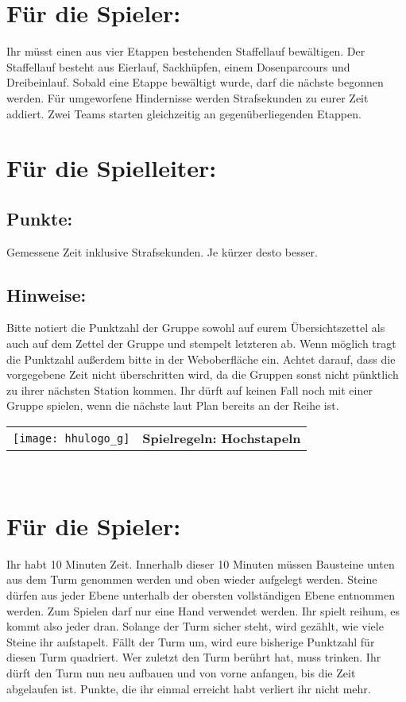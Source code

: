 \documentclass[a4paper,10pt]{article}
\def\spielc{Hochstapeln}
\newcommand{\unten}{
 Bitte notiert die Punktzahl der Gruppe sowohl auf eurem Übersichtszettel als auch auf dem Zettel der Gruppe und stempelt letzteren ab. Wenn möglich tragt die Punktzahl außerdem bitte in der Weboberfläche ein.
 Achtet darauf, dass die vorgegebene Zeit nicht überschritten wird, da die Gruppen sonst nicht pünktlich zu ihrer nächsten Station kommen. Ihr dürft auf keinen Fall noch mit einer Gruppe spielen, wenn die nächste laut Plan bereits an der Reihe ist.
}
\begin{document}
\Large
\section*{Für die Spieler:}
Ihr müsst einen aus vier Etappen bestehenden Staffellauf bewältigen. 
Der Staffellauf besteht aus Eierlauf, Sackhüpfen, einem Dosenparcours und 
Dreibeinlauf. Sobald eine Etappe bewältigt wurde, darf die nächste begonnen
werden. Für umgeworfene Hindernisse werden Strafsekunden zu eurer Zeit 
addiert. Zwei Teams starten gleichzeitig an gegenüberliegenden Etappen.

\section*{Für die Spielleiter:}
\subsection*{Punkte:}
Gemessene Zeit inklusive Strafsekunden. Je kürzer desto besser.

\subsection*{Hinweise:}
\unten

\newpage


  \begin{tabularx}{\textwidth}{lc}
    \texttt{[image: hhulogo\_g]}
  & {\Huge \textbf{Spielregeln: \spielc}}
  \end{tabularx}\\

\Large
\section*{Für die Spieler:}
Ihr habt 10 Minuten Zeit. Innerhalb dieser 10 Minuten müssen Bausteine unten aus dem Turm genommen werden und oben wieder aufgelegt werden. Steine dürfen aus jeder Ebene unterhalb der obersten vollständigen Ebene entnommen werden. Zum Spielen darf nur eine Hand verwendet werden. Ihr spielt reihum, es kommt also jeder dran. Solange der Turm sicher steht, wird gezählt, wie viele Steine ihr aufstapelt. Fällt der Turm um, wird eure bisherige Punktzahl für diesen Turm quadriert. Wer zuletzt den Turm berührt hat, muss trinken. Ihr dürft den Turm nun neu aufbauen und von vorne anfangen, bis die Zeit abgelaufen ist. Punkte, die ihr einmal erreicht habt verliert ihr nicht mehr.
\end{document}
